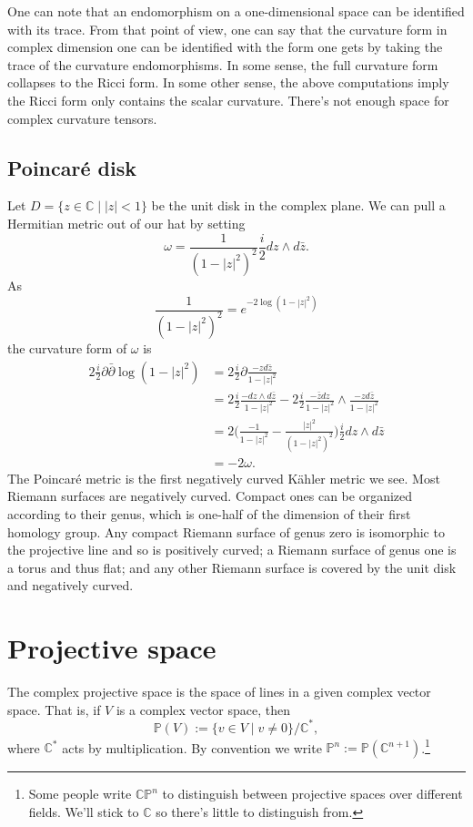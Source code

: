 \documentclass[11pt]{article}
\newcommand{\kk}[1]{\mathbb{#1}}
\begin{document}
One can note that an endomorphism on a one-dimensional space can be identified with its trace. From that point of view, one can say that the curvature form in complex dimension one can be identified with the form one gets by taking the trace of the curvature endomorphisms. In some sense, the full curvature form collapses to the Ricci form. In some other sense, the above computations imply the Ricci form only contains the scalar curvature. There's not enough space for complex curvature tensors.


\subsection{Poincar\'e disk}

Let $D = \{z \in \kk C \mid |z| < 1\}$ be the unit disk in the complex plane. We can pull a Hermitian metric out of our hat by setting
$$
\omega = \frac 1{(1-|z|^2)^2} \frac i2 dz \wedge d\bar z.
$$
As
$$
\frac 1{(1-|z|^2)^2} = e^{-2\log(1-|z|^2)}
$$
the curvature form of $\omega$ is
\begin{align*}
2\frac i2 \partial\bar\partial \log(1-|z|^2)
&= 2\frac i2 \partial \frac{-z d\bar z}{1-|z|^2}
\\
&= 2\frac i2 \frac{- dz \wedge d\bar z}{1-|z|^2}
- 2\frac i2 \frac{-\bar z dz}{1-|z|^2} \wedge \frac{-zd\bar z}{1-|z|^2}
\\
&= 2\biggl(\frac{-1}{1-|z|^2} - \frac{|z|^2}{(1-|z|^2)^2} \biggr) \frac i2 dz \wedge d\bar z
\\
&= -2 \omega.
\end{align*}
The Poincar\'e metric is the first negatively curved K\"ahler metric we see. Most Riemann surfaces are negatively curved. Compact ones can be organized according to their genus, which is one-half of the dimension of their first homology group. Any compact Riemann surface of genus zero is isomorphic to the projective line and so is positively curved; a Riemann surface of genus one is a torus and thus flat; and any other Riemann surface is covered by the unit disk and negatively curved.



\section{Projective space}
\label{sec:orgcfabeed}

The complex projective space is the space of lines in a given complex vector space. That is, if $V$ is a complex vector space, then
$$
\kk P(V) := \{ v \in V \mid v \not= 0 \} / \kk C^*,
$$
where $\kk C^*$ acts by multiplication. By convention we write $\kk P^n := \kk P(\kk C^{n+1})$.\footnote{Some people write $\kk C \kk P^n$ to distinguish between projective spaces over different fields. We'll stick to $\kk C$ so there's little to distinguish from.}
\end{document}

